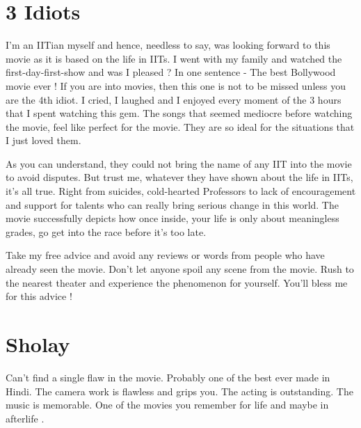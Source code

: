 \documentclass{article}
\begin{document}
\section{3 Idiots}
	
I'm an IITian myself and hence, needless to say, was looking forward to this movie as it is based on the life in IITs. I went with my family and watched the first-day-first-show and was I pleased ? In one sentence - The best Bollywood movie ever ! If you are into movies, then this one is not to be missed unless you are the 4th idiot. I cried, I laughed and I enjoyed every moment of the 3 hours that I spent watching this gem. The songs that seemed mediocre before watching the movie, feel like perfect for the movie. They are so ideal for the situations that I just loved them.

As you can understand, they could not bring the name of any IIT into the movie to avoid disputes. But trust me, whatever they have shown about the life in IITs, it's all true. Right from suicides, cold-hearted Professors to lack of encouragement and support for talents who can really bring serious change in this world. The movie successfully depicts how once inside, your life is only about meaningless grades, go get into the race before it's too late.

Take my free advice and avoid any reviews or words from people who have already seen the movie. Don't let anyone spoil any scene from the movie. Rush to the nearest theater and experience the phenomenon for yourself. You'll bless me for this advice !

\section{Sholay}
	

Can't find a single flaw in the movie. Probably one of the best ever made in Hindi. The camera work is flawless and grips you. The acting is outstanding. The music is memorable. One of the movies you remember for life and maybe in afterlife . 
\end{document}
